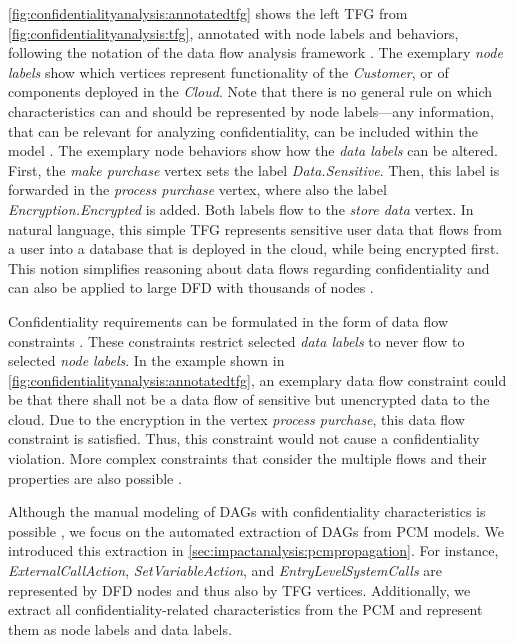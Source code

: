 \autoref{fig:confidentialityanalysis:annotatedtfg} shows the left \ac{TFG} from \autoref{fig:confidentialityanalysis:tfg}, annotated with node labels and behaviors, following the notation of the data flow analysis framework \cite{boltz_extensible_2024}.
The exemplary \emph{node labels} show which vertices represent functionality of the \emph{Customer}, or of components deployed in the \emph{Cloud}.
Note that there is no general rule on which characteristics can and should be represented by node labels---any information, that can be relevant for analyzing confidentiality, can be included within the model \cite{seifermann_architectural_2022}.
The exemplary node behaviors show how the \emph{data labels} can be altered.
First, the \emph{make purchase} vertex sets the label \emph{Data.Sensitive}.
Then, this label is forwarded in the \emph{process purchase} vertex, where also the label \emph{Encryption.Encrypted} is added.
Both labels flow to the \emph{store data} vertex.
In natural language, this simple \ac{TFG} represents sensitive user data that flows from a user into a database that is deployed in the cloud, while being encrypted first.
This notion simplifies reasoning about data flows regarding confidentiality and can also be applied to large \ac{DFD} with thousands of nodes \cite{schwickerath_tool-supported_2023}.

Confidentiality requirements can be formulated in the form of data flow constraints \cite{hahner_modeling_2021}.
These constraints restrict selected \emph{data labels} to never flow to selected \emph{node labels}.
In the example shown in \autoref{fig:confidentialityanalysis:annotatedtfg}, an exemplary data flow constraint could be that there shall not be a data flow of sensitive but unencrypted data to the cloud.
Due to the encryption in the vertex \emph{process purchase}, this data flow constraint is satisfied.
Thus, this constraint would not cause a confidentiality violation.
More complex constraints that consider the multiple flows and their properties are also possible \cite{hahner_modeling_2021,boltz_extensible_2024}.


Although the manual modeling of \acp{DAG} with confidentiality characteristics is possible \cite{boltz_extensible_2024}, we focus on the automated extraction of \acp{DAG} from \ac{PCM} models.
We introduced this extraction in \autoref{sec:impactanalysis:pcmpropagation}.
For instance, \emph{ExternalCallAction}, \emph{SetVariableAction}, and \emph{EntryLevelSystemCalls} are represented by \ac{DFD} nodes and thus also by \ac{TFG} vertices.
Additionally, we extract all confidentiality-related characteristics from the \ac{PCM} and represent them as node labels and data labels.

